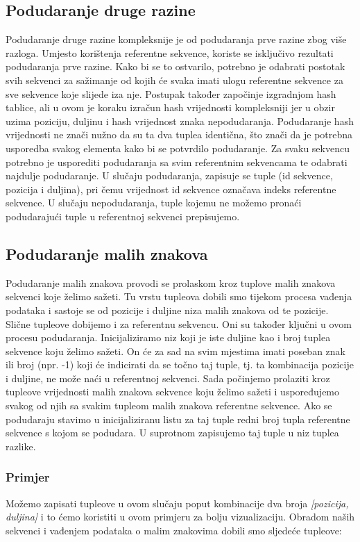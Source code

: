 \subsection{Podudaranje druge razine}
Podudaranje druge razine kompleksnije je od podudaranja prve razine zbog više razloga. Umjesto korištenja referentne sekvence, koriste se isključivo rezultati podudaranja prve razine. Kako bi se to ostvarilo, potrebno je odabrati postotak svih sekvenci za sažimanje od kojih će svaka imati ulogu referentne sekvence za sve sekvence koje slijede iza nje.
Postupak također započinje izgradnjom hash tablice, ali u ovom je koraku izračun hash vrijednosti kompleksniji jer u obzir uzima poziciju, duljinu i hash vrijednost znaka nepodudaranja. Podudaranje hash vrijednosti ne znači nužno da su ta dva tuplea identična, što znači da je potrebna usporedba svakog elementa kako bi se potvrdilo podudaranje. Za svaku sekvencu potrebno je usporediti podudaranja sa svim referentnim sekvencama te odabrati najdulje podudaranje. U slučaju podudaranja, zapisuje se tuple (id sekvence, pozicija i duljina), pri čemu vrijednost id sekvence označava indeks referentne sekvence. U slučaju nepodudaranja, tuple kojemu ne možemo pronaći podudarajući tuple u referentnoj sekvenci prepisujemo.

\subsection{Podudaranje malih znakova}
Podudaranje malih znakova provodi se prolaskom kroz tuplove malih znakova sekvenci koje želimo sažeti. Tu vrstu tupleova dobili smo tijekom procesa vađenja podataka i sastoje se od pozicije i duljine niza malih znakova od te pozicije. Slične tupleove dobijemo i za referentnu sekvencu. Oni su također ključni u ovom procesu podudaranja. Inicijaliziramo niz koji je iste duljine kao i broj tuplea sekvence koju želimo sažeti. On će za sad na svim mjestima imati poseban znak ili broj (npr. -1) koji će indicirati da se točno taj tuple, tj. ta kombinacija pozicije i duljine, ne može naći u referentnoj sekvenci. Sada počinjemo prolaziti kroz tupleove vrijednosti malih znakova sekvence koju želimo sažeti i uspoređujemo svakog od njih sa svakim tupleom malih znakova referentne sekvence. Ako se podudaraju stavimo u inicijaliziranu listu za taj tuple redni broj tupla referentne sekvence s kojom se podudara. U suprotnom zapisujemo taj tuple u niz tuplea razlike. 

\subsubsection{Primjer}
Možemo zapisati tupleove u ovom slučaju poput kombinacije dva broja \textit{[pozicija, duljina]} i to ćemo koristiti u ovom primjeru za bolju vizualizaciju. 
Obradom naših sekvenci  i vađenjem podataka o malim znakovima dobili smo sljedeće tupleove:\newline

